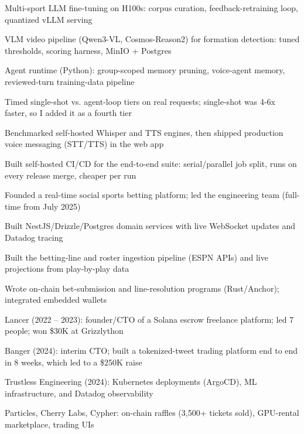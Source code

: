 \documentclass[print]{jack-resume}
\begin{document}
\begin{tightemize}
    \item Multi-sport LLM fine-tuning on H100s: corpus curation, feedback-retraining loop, quantized vLLM serving
    \item VLM video pipeline (Qwen3-VL, Cosmos-Reason2) for formation detection: tuned thresholds, scoring harness, MinIO + Postgres
    \item Agent runtime (Python): group-scoped memory pruning, voice-agent memory, reviewed-turn training-data pipeline
    \item Timed single-shot vs. agent-loop tiers on real requests; single-shot was 4-6x faster, so I added it as a fourth tier
    \item Benchmarked self-hosted Whisper and TTS engines, then shipped production voice messaging (STT/TTS) in the web app
    \item Built self-hosted CI/CD for the end-to-end suite: serial/parallel job split, runs on every release merge, cheaper per run
\end{tightemize}
\sectionsep

\begin{tightemize}
    \item Founded a real-time social sports betting platform; led the engineering team (full-time from July 2025)
    \item Built NestJS/Drizzle/Postgres domain services with live WebSocket updates and Datadog tracing
    \item Built the betting-line and roster ingestion pipeline (ESPN APIs) and live projections from play-by-play data
    \item Wrote on-chain bet-submission and line-resolution programs (Rust/Anchor); integrated embedded wallets
\end{tightemize}
\sectionsep

\begin{tightemize}
    \item Lancer (2022 – 2023): founder/CTO of a Solana escrow freelance platform; led 7 people; won \$30K at Grizzlython
    \item Banger (2024): interim CTO; built a tokenized-tweet trading platform end to end in 8 weeks, which led to a \$250K raise
    \item Trustless Engineering (2024): Kubernetes deployments (ArgoCD), ML infrastructure, and Datadog observability
    \item Particles, Cherry Labs, Cypher: on-chain raffles (3,500+ tickets sold), GPU-rental marketplace, trading UIs
\end{tightemize}
\sectionsep
\end{document}
